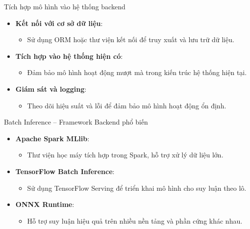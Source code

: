 \documentclass{beamer}
\begin{document}
\begin{frame}{Tích hợp mô hình vào hệ thống backend}
    \begin{itemize}
        \item \textbf{Kết nối với cơ sở dữ liệu}:
        \begin{itemize}
            \item Sử dụng ORM hoặc thư viện kết nối để truy xuất và lưu trữ dữ liệu.
        \end{itemize}
        \item \textbf{Tích hợp vào hệ thống hiện có}:
        \begin{itemize}
            \item Đảm bảo mô hình hoạt động mượt mà trong kiến trúc hệ thống hiện tại.
        \end{itemize}
        \item \textbf{Giám sát và logging}:
        \begin{itemize}
            \item Theo dõi hiệu suất và lỗi để đảm bảo mô hình hoạt động ổn định.
        \end{itemize}
    \end{itemize}
\end{frame}
    
\begin{frame}{Batch Inference – Framework Backend phổ biến}
    \begin{itemize}
        \item \textbf{Apache Spark MLlib}:
        \begin{itemize}
            \item Thư viện học máy tích hợp trong Spark, hỗ trợ xử lý dữ liệu lớn.
        \end{itemize}
        \item \textbf{TensorFlow Batch Inference}:
        \begin{itemize}
            \item Sử dụng TensorFlow Serving để triển khai mô hình cho suy luận theo lô.
        \end{itemize}
        \item \textbf{ONNX Runtime}:
        \begin{itemize}
            \item Hỗ trợ suy luận hiệu quả trên nhiều nền tảng và phần cứng khác nhau.
        \end{itemize}
    \end{itemize}
\end{frame}
\end{document}
